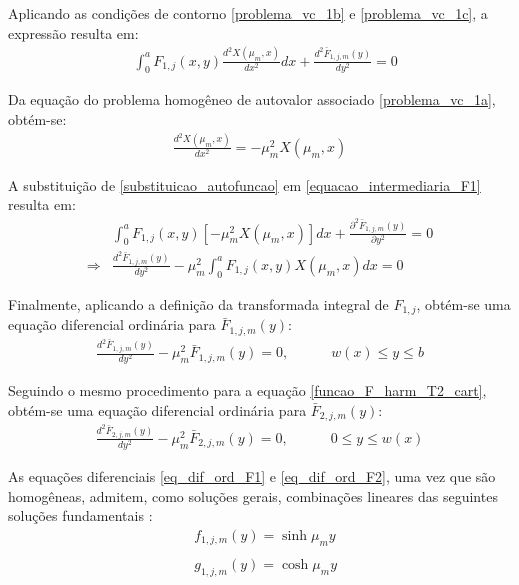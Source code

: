 Aplicando as condições de contorno \eqref{problema_vc_1b} e \eqref{problema_vc_1c}, a expressão resulta em: 
\begin{align}
&
\int_0^a  F_{1,j}(x, y)\frac{d^2X(\mu_m, x)}{dx^2} dx + \frac{d^2 \bar{F}_{1,j,m}(y)}{d y^2} = 0 \label{equacao_intermediaria_F1}
\end{align}

Da equação do problema homogêneo de autovalor associado \eqref{problema_vc_1a}, obtém-se:
\begin{align}
\frac{d^2 X(\mu_m, x)}{d x^2} = -\mu_m^2 X(\mu_m, x) \label{substituicao_autofuncao}
\end{align}

A substituição de \eqref{substituicao_autofuncao} em \eqref{equacao_intermediaria_F1} resulta em:
\begin{align}
&
\int_0^a  F_{1,j}(x, y)[-\mu_m^2 X(\mu_m, x)] dx + \frac{\partial^2 \bar{F}_{1,j,m}(y)}{\partial y^2} = 0 \nonumber \\
\Rightarrow &
\frac{d^2 \bar{F}_{1,j,m}(y)}{d y^2}
-
\mu_m^2 \int_0^a  F_{1,j}(x, y)X(\mu_m, x) dx = 0
\end{align}

Finalmente, aplicando a definição da transformada integral de $F_{1, j}$, obtém-se uma equação diferencial ordinária para $\bar{F}_{1,j,m}(y)$:
\begin{align}
\frac{d^2 \bar{F}_{1,j,m}(y)}{d y^2}
-
\mu_m^2 \bar{F}_{1,j,m}(y) = 0, \quad\quad\quad w(x) \le y \le b \label{eq_dif_ord_F1}
\end{align}

Seguindo o mesmo procedimento para a equação \eqref{funcao_F_harm_T2_cart}, obtém-se uma equação diferencial ordinária para $\bar{F}_{2,j,m}(y)$:
\begin{align}
\frac{d^2 \bar{F}_{2,j,m}(y)}{d y^2}
-
\mu_m^2 \bar{F}_{2,j,m}(y) = 0, \quad\quad\quad  0 \le y \le w(x) \label{eq_dif_ord_F2}
\end{align}

As equações diferenciais \eqref{eq_dif_ord_F1} e \eqref{eq_dif_ord_F2}, uma vez que são homogêneas, admitem, como soluções gerais, combinações lineares das seguintes soluções fundamentais \citep{livro_boyce}:
\begin{align}
& f_{1,j,m}(y) = \sinh\mu_m y \label{basic_1}\\ \nonumber \\
& g_{1,j,m}(y) = \cosh\mu_m y \label{basic_2}
\end{align}

